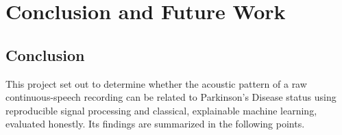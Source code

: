 \chapter{Conclusion and Future Work}

\section{Conclusion}

This project set out to determine whether the acoustic pattern of a raw
continuous-speech recording can be related to Parkinson's Disease
status using reproducible signal processing and classical, explainable
machine learning, evaluated honestly. Its findings are summarized in
the following points.

